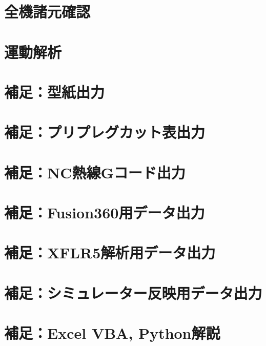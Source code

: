 \documentclass[a4paper,11pt,uplatex]{jsarticle}
\begin{document}
\section{全機諸元確認}
\section{運動解析}
\section{補足：型紙出力}
\section{補足：プリプレグカット表出力}
\section{補足：NC熱線Gコード出力}
\section{補足：Fusion360用データ出力}
\section{補足：XFLR5解析用データ出力}
\section{補足：シミュレーター反映用データ出力}
\section{補足：Excel VBA, Python解説}
\end{document}
